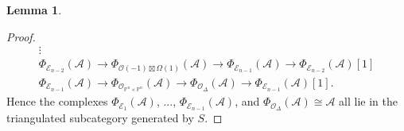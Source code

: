 \documentclass[a4paper]{article}
\theoremstyle{definition}
\newtheorem{lemma}[defn]{Lemma}
\theoremstyle{remark}
\newcommand{\Pn}{\ensuremath{{\mathbb{P}^n}}}
\begin{document}
\begin{lemma}
\begin{proof}
\begin{gather*}
            \vdots \\ 
            \Phi_{\mathscr{E}_{n-2}}(\mathscr{A}) \longrightarrow
            \Phi_{\mathscr{O}(-1)\boxtimes \Omega(1)}(\mathscr{A})
            \longrightarrow \Phi_{\mathscr{E}_{n-1}}(\mathscr{A})
            \longrightarrow \Phi_{\mathscr{E}_{n-2}}(\mathscr{A}) [1]  \\ 
            \Phi_{\mathscr{E}_{n-1}}(\mathscr{A}) \longrightarrow
            \Phi_{\mathscr{O}_{\Pn\times \Pn}}(\mathscr{A})\longrightarrow
            \Phi_{\mathscr{O}_\Delta}(\mathscr{A})
            \longrightarrow \Phi_{\mathscr{E}_{n-1}}(\mathscr{A})[1].  
        \end{gather*} 
        Hence the complexes
        \(\Phi_{\mathscr{E}_1}(\mathscr{A})\),
        ...,
        \(\Phi_{\mathscr{E}_{n-1}}(\mathscr{A})\), and \(\Phi_{\mathscr{O}_\Delta}(\mathscr{A})\cong
        \mathscr{A}\) all lie in the triangulated subcategory generated by
        \(S\).
    \end{proof}
\end{lemma}
\end{document}
